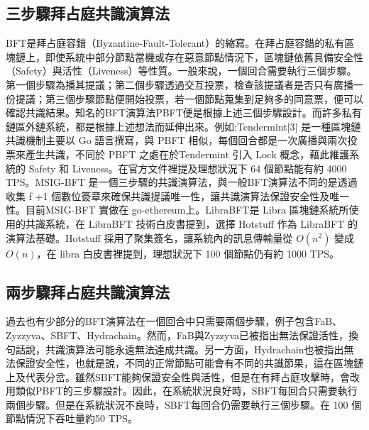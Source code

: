 \subsection{三步驟拜占庭共識演算法}\label{se_7}

BFT是拜占庭容錯（Byzantine-Fault-Tolerant）的縮寫。在拜占庭容錯的私有區塊鏈上，即使系統中部分節點當機或存在惡意節點情況下，區塊鏈依舊具備安全性（Safety）與活性（Liveness）等性質。一般來說，一個回合需要執行三個步驟。第一個步驟為播其提議；第二個步驟透過交互投票，檢查該提議者是否只有廣播一份提議；第三個步驟節點便開始投票，若一個節點蒐集到足夠多的同意票，便可以確認共識結果。知名的BFT演算法PBFT\cite{castro1999practical}便是根據上述三個步驟設計。而許多私有鏈區外鏈系統，都是根據上述想法而延伸出來。例如:Tendermint[3] 是一種區塊鏈共識機制主要以 Go 語言撰寫，與 PBFT 相似，每個回合都是一次廣播與兩次投票來產生共識，不同於 PBFT 之處在於Tendermint 引入 Lock 概念，藉此維護系統的 Safety 和 Liveness。在官方文件裡提及理想狀況下 64 個節點能有約 4000 TPS。MSIG­-BFT 是一個三步驟的共識演算法，與一般BFT演算法不同的是透過收集 f +1 個數位簽章來確保共識提議唯一性，讓共識演算法保證安全性及唯一性。目前MSIG­-BFT 實做在 go­-ethereum上。LibraBFT\cite{STEVE_HANNA2010}是 Libra 區塊鏈系統所使用的共識系統，在 LibraBFT 技術白皮書提到，選擇 Hotstuff\cite{yin2018hotstuff} 作為 LibraBFT 的演算法基礎。Hotstuff 採用了聚集簽名，讓系統內的訊息傳輸量從 $O(n^2)$ 變成 $O(n)$，在 libra 白皮書裡提到，理想狀況下 100 個節點仍有約 1000 TPS。

\subsection{兩步驟拜占庭共識演算法}\label{se_7}
過去也有少部分的BFT演算法在一個回合中只需要兩個步驟，例子包含FaB\cite{abraham2018revisiting}、Zyzzyva\cite{kotla2007zyzzyva}、SBFT\cite{martin2006fast}、Hydrachain\cite{Hydrachain}。然而，FaB與Zyzzyva已被指出無法保證活性，換句話說，共識演算法可能永遠無法達成共識。另一方面，Hydrachain也被指出無法保證安全性，也就是說，不同的正常節點可能會有不同的共識節果，這在區塊鏈上及代表分岔。雖然SBFT能夠保證安全性與活性，但是在有拜占庭攻擊時，會改用類似PBFT的三步驟設計。因此，在系統狀況良好時，SBFT每回合只需要執行兩個步驟。但是在系統狀況不良時，SBFT每回合仍需要執行三個步驟。在 100 個節點情況下吞吐量約50 TPS。


